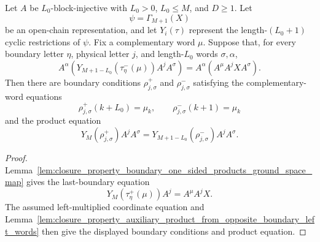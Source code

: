 \begin{theorem}
    \label{thm:closure_property_auxiliary_boundary_product_ground_space_left_words}
    \leanok
    Let $A$ be $L_0$-block-injective with $L_0>0$, $L_0\le M$, and
    $D\ge1$. Let
    \[
        \psi=\Gamma_{M+1}(X)
    \]
    be an open-chain representation, and let $Y_i(\tau)$ represent the
    length-$(L_0+1)$ cyclic restrictions of $\psi$. Fix a complementary word
    $\mu$. Suppose that, for every boundary letter $\eta$, physical letter
    $j$, and length-$L_0$ words $\sigma,\alpha$,
    \[
        A^\alpha
        \left(Y_{M+1-L_0}(\tau^-_\eta(\mu))A^jA^\sigma\right)
        =
        A^\alpha
        \left(A^\mu A^jXA^\sigma\right).
    \]
    Then there are boundary conditions $\rho^+_{j,\sigma}$ and
    $\rho^-_{j,\sigma}$ satisfying the complementary-word equations
    \[
        \rho^+_{j,\sigma}(k+L_0)=\mu_k,
        \qquad
        \rho^-_{j,\sigma}(k+1)=\mu_k
    \]
    and the product equation
    \[
        Y_M(\rho^+_{j,\sigma})A^jA^\sigma
        =
        Y_{M+1-L_0}(\rho^-_{j,\sigma})A^jA^\sigma .
    \]
\end{theorem}

\begin{proof}
    \leanok
    Lemma~\ref{lem:closure_property_boundary_one_sided_products_ground_space_map}
    gives the last-boundary equation
    \[
        Y_M(\tau^+_\eta(\mu))A^j=A^\mu A^jX .
    \]
    The assumed left-multiplied coordinate equation and
    Lemma~\ref{lem:closure_property_auxiliary_product_from_opposite_boundary_left_words}
    then give the displayed boundary conditions and product equation.
\end{proof}

